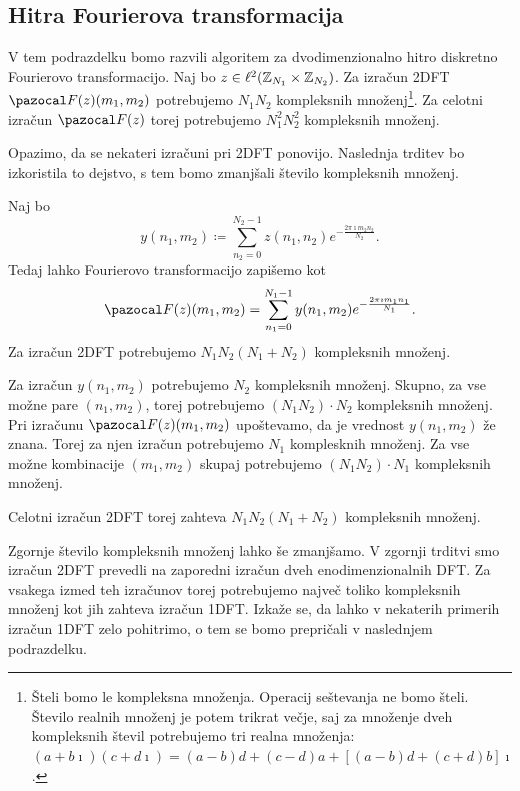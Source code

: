 \subsection{Hitra Fourierova transformacija}
V tem podrazdelku bomo razvili algoritem za dvodimenzionalno hitro diskretno Fouriero\-vo transformacijo.
Naj bo $z \in \ell^2(\mathbb Z_{N_1} \times \mathbb Z_{N_2})$. Za izračun 2DFT $\F(z)(m_1, m_2)$ potrebujemo $N_1 N_2$ kompleksnih množenj\footnote{Šteli bomo le kompleksna množenja. Operacij seštevanja ne bomo šteli. Število realnih množenj je potem trikrat večje, saj za množenje dveh kompleksnih števil potrebujemo tri realna množenja: $(a + b \imath)(c + d\imath) = (a - b)d + (c - d)a + [(a - b)d + (c + d)b]\imath$.}. Za celotni izračun $\F(z)$ torej potrebujemo $N_1^2 N_2^2$ kompleksnih množenj.

Opazimo, da se nekateri izračuni pri 2DFT ponovijo. Naslednja trditev bo izkoristila to dejstvo, s tem bomo zmanjšali število kompleksnih množenj.
%
\begin{trditev}
Naj bo
$$y(n_1, m_2) \coloneqq \sum_{n_2 = 0}^{N_2 - 1} z(n_1, n_2) e^{-\frac{2\pi \imath m_2n_2}{N_2}}.$$
Tedaj lahko Fourierovo transformacijo zapišemo kot
$$\F(z)(m_1, m_2) = \sum_{n_1 = 0}^{N_1 - 1} y(n_1, m_2) e^{-\frac{2\pi \imath m_1n_1}{N_1}}.$$
Za izračun 2DFT potrebujemo $N_1 N_2 (N_1 + N_2)$ kompleksnih množenj.
\end{trditev}
%
\begin{dokaz}
Za izračun $y(n_1, m_2)$ potrebujemo $N_2$ kompleksnih množenj. Skupno, za vse možne pare $(n_1, m_2)$, torej potrebujemo $(N_1 N_2)\cdot N_2$ kompleksnih množenj. Pri izračunu $\F(z)(m_1, m_2)$ upoštevamo, da je vrednost $y(n_1, m_2)$ že znana. Torej za njen izračun potrebujemo $N_1$ komplesknih množenj. Za vse možne kombinacije $(m_1, m_2)$ skupaj potrebujemo $(N_1 N_2) \cdot N_1$ kompleksnih množenj.

Celotni izračun 2DFT torej zahteva $N_1 N_2 (N_1 + N_2)$ kompleksnih množenj. 
\end{dokaz}
%
Zgornje število kompleksnih množenj lahko še zmanjšamo. V zgornji trditvi smo izračun 2DFT prevedli na zaporedni izračun dveh enodimenzionalnih DFT. Za vsakega izmed teh izračunov torej potrebujemo največ toliko kompleksnih množenj kot jih zahteva izračun 1DFT. Izkaže se, da lahko v nekaterih primerih izračun 1DFT zelo pohitrimo, o tem se bomo prepričali v naslednjem podrazdelku. 
%

